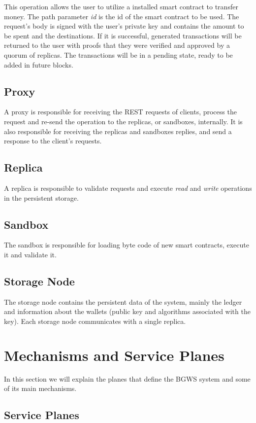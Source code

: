 \documentclass[10pt,journal,compsoc]{IEEEtran}
\begin{document}
	This operation allows the user to utilize a installed smart contract to transfer money. The path parameter \textit{id} is the id of the smart contract to be used. The request's body is signed with the user's private key and contains the amount to be spent and the destinations. If it is successful, generated transactions will be returned to the user with proofs that they were verified and approved by a quorum of replicas. The transactions will be in a pending state, ready to be added in future blocks.
	
	\subsection{Proxy}
	A proxy is responsible for receiving the REST requests of clients, process the request and re-send the operation to the replicas, or sandboxes, internally. It is also responsible for receiving the replicas and sandboxes replies, and send a response to the client's requests.
	
	\subsection{Replica}
	A replica is responsible to validate requests and execute \textit{read} and \textit{write} operations in the persistent storage. 
	\subsection{Sandbox}
	The sandbox is responsible for loading byte code of new smart contracts, execute it and validate it. 
	
	
	\subsection{Storage Node}
	The storage node contains the persistent data of the system, mainly the ledger and information about the wallets (public key and algorithms associated with the key). Each storage node communicates with a single replica.
	


	\section{Mechanisms and Service Planes}
	In this section we will explain the planes that define the BGWS system and some of its main mechanisms.
	
	\subsection{Service Planes}
\end{document}
